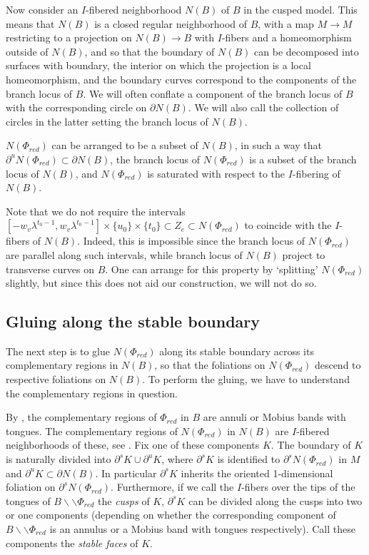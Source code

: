 \documentclass[12pt]{amsart}
\theoremstyle{definition}
\numberwithin{equation}{section}
\begin{document}
Now consider an $I$-fibered neighborhood $N(B)$ of $B$ in the cusped model. This means that $N(B)$ is a closed regular neighborhood of $B$, with a map $M \to M$ restricting to a projection on $N(B) \to B$ with $I$-fibers and a homeomorphism outside of $N(B)$, and so that the boundary of $N(B)$ can be decomposed into surfaces with boundary, the interior on which the projection is a local homeomorphism, and the boundary curves correspond to the components of the branch locus of $B$. We will often conflate a component of the branch locus of $B$ with the corresponding circle on $\partial N(B)$. We will also call the collection of circles in the latter setting the branch locus of $N(B)$. 

$N(\Phi_{red})$ can be arranged to be a subset of $N(B)$, in such a way that $\partial^u N(\Phi_{red}) \subset \partial N(B)$, the branch locus of $N(\Phi_{red})$ is a subset of the branch locus of $N(B)$, and $N(\Phi_{red})$ is saturated with respect to the $I$-fibering of $N(B)$.

Note that we do not require the intervals $[-w_v \lambda^{t_0-1}, w_v \lambda^{t_0-1}] \times \{ u_0 \} \times \{ t_0 \} \subset Z_e \subset N(\Phi_{red})$ to coincide with the $I$-fibers of $N(B)$. Indeed, this is impossible since the branch locus of $N(\Phi_{red})$ are parallel along such intervals, while branch locus of $N(B)$ project to transverse curves on $B$. One can arrange for this property by `splitting' $N(\Phi_{red})$ slightly, but since this does not aid our construction, we will not do so. 

\subsection{Gluing along the stable boundary} \label{subsec:stableglue}

The next step is to glue $N(\Phi_{red})$ along its stable boundary across its complementary regions in $N(B)$, so that the foliations on $N(\Phi_{red})$ descend to respective foliations on $N(B)$. To perform the gluing, we have to understand the complementary regions in question. 

By , the complementary regions of $\Phi_{red}$ in $B$ are annuli or Mobius bands with tongues. The complementary regions of $N(\Phi_{red})$ in $N(B)$ are $I$-fibered neighborhoods of these, see . Fix one of these components $K$. The boundary of $K$ is naturally divided into $\partial^s K \cup \partial^u K$, where $\partial^s K$ is identified to $\partial^s N(\Phi_{red})$ in $M$ and $\partial^u K \subset \partial N(B)$. In particular $\partial^s K$ inherits the oriented 1-dimensional foliation on $\partial^s N(\Phi_{red})$. Furthermore, if we call the $I$-fibers over the tips of the tongues of $B \backslash \backslash \Phi_{red}$ the \textit{cusps} of $K$, $\partial^s K$ can be divided along the cusps into two or one components (depending on whether the corresponding component of $B \backslash \backslash \Phi_{red}$ is an annulus or a Mobius band with tongues respectively). Call these components the \textit{stable faces} of $K$. 
\end{document}
